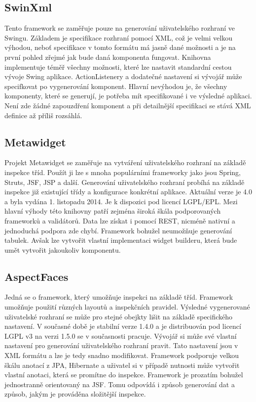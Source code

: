 \subsection{SwinXml}
Tento framework se zaměřuje pouze na generování uživatelského rozhraní ve Swingu. Základem je specifikace rozhraní pomocí XML, což je velmi velkou výhodou, neboť specifikace v tomto formátu má jasně dané možnosti a je na první pohled zřejmé jak bude daná komponenta fungovat. Knihovna implementuje téměř všechny možnosti, které lze nastavit standardní cestou vývoje Swing aplikace. ActionListenery a dodatečné nastavení si vývojář může specifkovat po vygenerování komponent. Hlavní nevýhodou je, že všechny komponenty, které se generují, je potřeba mít specifikované i ve výsledné aplikaci. Není zde žádné zapouzdření komponent a při detailnější specifikaci se stává XML definice až příliš rozsáhlá.
\subsection{Metawidget}
Projekt Metawidget se zaměřuje na vytváření uživatelského rozhraní na základě inspekce tříd. Použít ji lze s mnoha populárními frameworky jako jsou Spring, Struts, JSF, JSP a další. Generování uživatelského rozhraní probíhá na základě inspekce již existující třídy a konfigurace konkrétní aplikace. Aktuální verze je 4.0 a byla vydána 1. listopadu 2014. Je k dispozici pod licencí LGPL/EPL. Mezi hlavní výhody této knihovny patří zejména široká škála podporovaných frameworků a validátorů. Data lze získat i pomocí REST, nicméně nativní a jednoduchá podpora zde chybí. Framework bohužel neumožňuje generování tabulek. Avšak lze vytvořit vlastní implementaci widget builderu, která bude umět vytvořit jakoukoliv komponentu.
\subsection{AspectFaces}
Jedná se o framework, který umožňuje inspekci na základě tříd. Framework umožňuje použití různých layoutů a inspekčních pravidel. Výsledné vygenerované uživatelské rozhraní se může pro stejné obejkty lišit na základě specifického nastavení. V současné době je stabilní verze 1.4.0 a je distribuován pod licencí LGPL v3 na verzi 1.5.0 se v současnosti pracuje. Vývojář si může své vlastní nastavení pro generování uživatelského rozhraní pravit. Tato nastavení jsou v XML formátu a lze je tedy snadno modifikovat. Framework podporuje velkou škálu anotací z JPA, Hibernate a uživatel si v případě nutnosti může vytvořit vlastní anotaci, která se promítne do inspekce. Framework je prozatím bohužel jednostranně orientovaný na JSF. Tomu odpovídá i způsob generování dat a způsob, jakým je prováděna složitější inspekce. 
